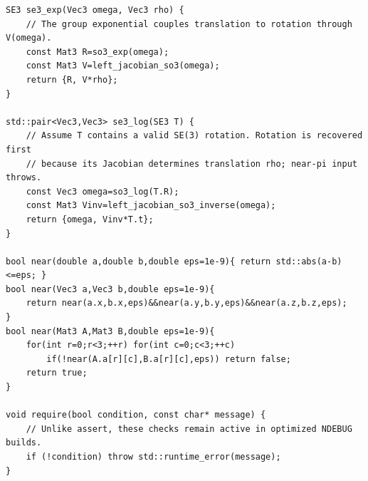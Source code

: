 \begin{verbatim}
SE3 se3_exp(Vec3 omega, Vec3 rho) {
    // The group exponential couples translation to rotation through V(omega).
    const Mat3 R=so3_exp(omega);
    const Mat3 V=left_jacobian_so3(omega);
    return {R, V*rho};
}

std::pair<Vec3,Vec3> se3_log(SE3 T) {
    // Assume T contains a valid SE(3) rotation. Rotation is recovered first
    // because its Jacobian determines translation rho; near-pi input throws.
    const Vec3 omega=so3_log(T.R);
    const Mat3 Vinv=left_jacobian_so3_inverse(omega);
    return {omega, Vinv*T.t};
}

bool near(double a,double b,double eps=1e-9){ return std::abs(a-b)<=eps; }
bool near(Vec3 a,Vec3 b,double eps=1e-9){
    return near(a.x,b.x,eps)&&near(a.y,b.y,eps)&&near(a.z,b.z,eps);
}
bool near(Mat3 A,Mat3 B,double eps=1e-9){
    for(int r=0;r<3;++r) for(int c=0;c<3;++c)
        if(!near(A.a[r][c],B.a[r][c],eps)) return false;
    return true;
}

void require(bool condition, const char* message) {
    // Unlike assert, these checks remain active in optimized NDEBUG builds.
    if (!condition) throw std::runtime_error(message);
}


\end{verbatim}
